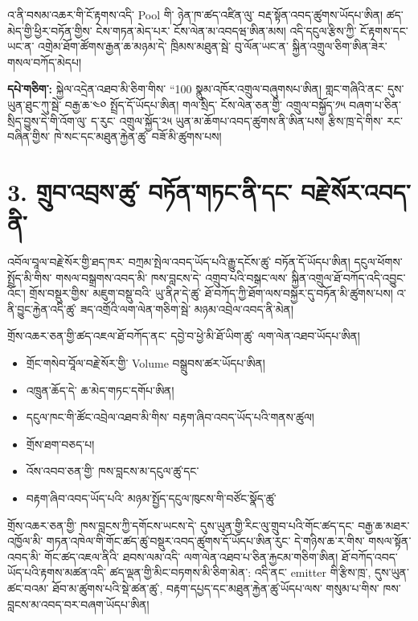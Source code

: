 \documentclass[11pt]{article}
\begin{document}
འ་ནི་བསམ་འཆར་གི་ངོ་རྟགས་འདི་ Pool གི་ ཉེན་ཁ་ཚད་འཛིན་ལུ་ བརྡ་སྟོན་འབད་ཚུགས་ཡོདཔ་ཨིན། ཚད་མེད་གྱི་ཕྱིར་བཏོན་གྱིས་ ངེས་གཏན་མེད་པར་ ངོས་ལེན་མ་འབདཝ་ཨིན་མས། འདི་དངུལ་རྩིས་ཀྱི་ ངོ་རྟགས་དང་ ཡང་ན་ འགྲེམ་ཐོག་ཚོགས་རྒྱན་ཆ་མཉམ་དེ་ ཁྲིམས་མཐུན་སྦེ་ བུ་ལོན་ཡང་ན་ སྐྱིན་འགྲུལ་ཅིག་ཨིན་ཟེར་ གསལ་བཀོད་མེདཔ།

\textbf{དཔེ་གཅིག་:} སྐྱེལ་འདྲེན་འཐབ་མི་ཅིག་གིས་ ``100 སྣུམ་འཁོར་འགྲུལ་བཞུགསཔ་ཨིན། གླང་གཞིའི་ནང་ དུས་ཡུན་ཐུང་ཀུ་སྦེ་ བརྒྱ་ཆ་༤༠ སྤྲོད་དོ་ཡོདཔ་ཨིན། གལ་སྲིད་ ངོས་ལེན་ཅན་གྱི་ འགྲུལ་བསྐྱོད་༡༥ བཞག་པ་ཅིན་ སྲིད་བྱུས་དེ་གི་འོག་ལུ་ ད་རུང་ འགྲུལ་སྐྱོད་༢༥ ཡུན་མ་ཆོགཔ་འབད་ཚུགས་ནི་ཨིན་པས། རྩིས་ཁྲ་དེ་གིས་ རང་བཞིན་གྱིས་ ཁེ་སང་དང་མཐུན་རྐྱེན་ཚུ་ བཟོ་མི་ཚུགས་པས།



\section*{3. གྲུབ་འབྲས་ཚུ་ བཏོན་གཏང་ནི་དང་ བརྗེ་སོར་འབད་ནི་}

འབོལ་བཱལ་བརྗེ་སོར་གྱི་ཐད་ཁར་ བཀྲམ་སྤེལ་འབད་ཡོད་པའི་རྒྱུ་དངོས་ཚུ་ བཏོན་དོ་ཡོདཔ་ཨིན། དངུལ་ཕོགས་སྤྲོད་མི་གིས་ གསལ་བསྒྲགས་འབད་མི་ ཁས་བླངས་དེ་ འགྲུབ་པའི་བསྒང་ལས་ སྐྱིན་འགྲུལ་ཐོ་བཀོད་འདི་འབྱུང་འོང་། གྲོས་བསྡུར་གྱིས་ མཇུག་བསྡུ་བའི་ ཡུ་ནིཊ་དེ་ཚུ་ ཐོ་བཀོད་ཀྱི་ཐོག་ལས་བསྐྱར་དུ་བཏོན་མི་ཚུགས་པས། འ་ནི་བྱུང་རྐྱེན་འདི་ཚུ་ ཟད་འགྲོའི་ལག་ལེན་གཅིག་སྦེ་ མཉམ་འབྲེལ་འབད་ནི་མེན།

གྲོས་འཆར་ཅན་གྱི་ཚད་འཇལ་ཐོ་བཀོད་ནང་ དབྱེ་བ་ཕྱེ་མི་ཐོ་ཡིག་ཚུ་ ལག་ལེན་འཐབ་ཡོདཔ་ཨིན།

\begin{itemize}[leftmargin=*]
\item གྲོང་གསེབ་བཱོལ་བརྗེ་སོར་གྱི་ Volume བསྒྲུབས་ཚར་ཡོདཔ་ཨིན།
\item འཁྲུན་ཆོད་དེ་ ཆ་མེད་གཏང་དགོཔ་ཨིན།
\item དངུལ་ཁང་གི་ཚོང་འབྲེལ་འཐབ་མི་གིས་ བརྟག་ཞིབ་འབད་ཡོད་པའི་གནས་ཚུལ།
\item གྲོས་ཐག་བཅད་པ།
\item འོས་འབབ་ཅན་གྱི་ ཁས་བླངས་མ་དངུལ་ཚུ་དང་
\item བརྟག་ཞིབ་འབད་ཡོད་པའི་ མཉམ་སྤྱོད་དངུལ་ཁུངས་གི་བཙོང་སྣོད་ཚུ་
\end{itemize}
གྲོས་འཆར་ཅན་གྱི་ ཁས་བླངས་ཀྱི་དགོངས་ཡངས་དེ་ དུས་ཡུན་གྱི་རིང་ལུ་གྲུབ་པའི་གོང་ཚད་དང་ བརྒྱ་ཆ་མཐར་འཁྱོལ་མི་ གཏན་འཁེལ་གི་གོང་ཚད་ཚུ་བསྡུར་འབད་ཚུགས་དོ་ཡོདཔ་ཨིན་རུང་ དེ་གཉིས་ཆ་ར་གིས་ གསལ་སྟོན་འབད་མི་ གོང་ཚད་འཇལ་ནིའི་ ཐབས་ལམ་འདི་ ལག་ལེན་འཐབ་པ་ཅིན་རྐྱངམ་གཅིག་ཨིན། ཐོ་བཀོད་འབད་ཡོད་པའི་རྟགས་མཚན་འདི་ ཚད་ལྡན་གྱི་མིང་བཏགས་མི་ཅིག་མེན་: འདི་ནང་ emitter གི་རྩིས་ཁྲ་, དུས་ཡུན་ཚང་བའམ་ ཐོབ་མ་ཚུགས་པའི་སྡེ་ཚན་ཚུ་, བརྟག་དཔྱད་དང་མཐུན་རྐྱེན་ཚུ་ཡོདཔ་ལས་ གསུམ་པ་གིས་ ཁས་བླངས་མ་འབད་བར་བཞག་ཡོདཔ་ཨིན།
\end{document}
